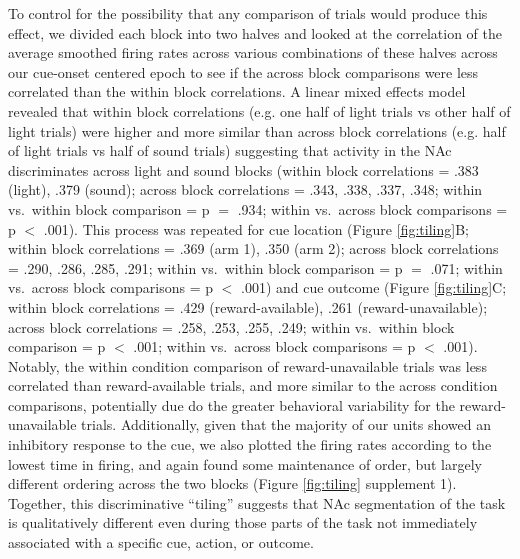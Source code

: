 \documentclass[11pt]{article}
\begin{document}
To control for the possibility that any comparison of
trials would produce this effect, we divided each
block into two halves and looked at the correlation of the average
smoothed firing rates across various combinations of these halves
across our cue-onset centered epoch to see if the across block comparisons were less correlated than the within block correlations. A linear mixed effects model
revealed that within block correlations (e.g. one half of light trials
vs other half of light trials) were higher and more similar than
across block correlations (e.g. half of light trials vs half of sound
trials) suggesting that activity in the NAc discriminates across
light and sound blocks (within block correlations = .383 (light), .379
(sound); across block correlations = .343, .338, .337, .348; within vs.\ within block comparison = p $=$ .934; within vs.\ across block comparisons = p $<$ .001). This process was repeated for cue location (Figure \ref{fig:tiling}B; within block
correlations = .369 (arm 1), .350 (arm 2); across block correlations =
.290, .286, .285, .291; within vs.\ within block comparison = p
$=$ .071; within vs.\ across block comparisons = p $<$ .001) and
cue outcome (Figure \ref{fig:tiling}C; within block correlations =
.429 (reward-available), .261 (reward-unavailable); across block
correlations = .258, .253, .255, .249; within vs.\ within block
comparison = p $<$ .001; within vs.\ across block comparisons =
p $<$ .001). Notably, the within condition comparison of reward-unavailable trials
was less correlated than reward-available trials, and more similar to
the across condition comparisons, potentially due do the greater
behavioral variability for the reward-unavailable trials. Additionally, given that the majority of our units showed an inhibitory response to the cue, we
also plotted the firing rates according to the lowest time in firing,
and again found some maintenance of order, but largely different
ordering across the two blocks (Figure \ref{fig:tiling} supplement 1). Together, this discriminative ``tiling'' suggests that NAc segmentation of the task is
qualitatively different even during those parts of the task not
immediately associated with a specific cue, action, or outcome.
\end{document}
